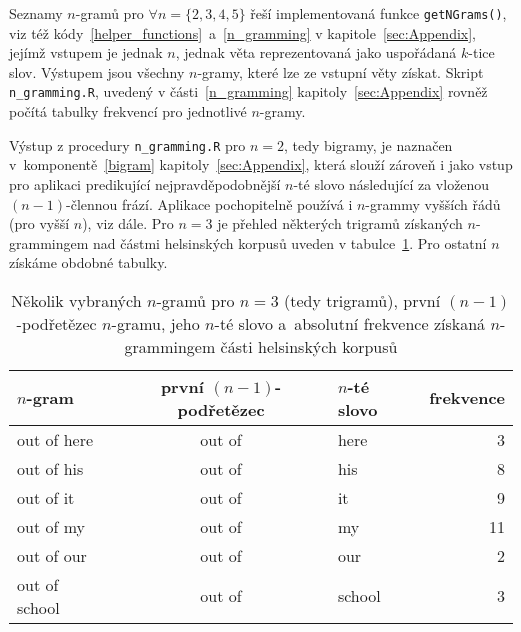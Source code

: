 Seznamy $n$-gramů pro $\forall n = \{2, 3, 4, 5\}$ řeší implementovaná
funkce \texttt{getNGrams()}, viz též kódy~\ref{helper_functions}~a~\ref{n_gramming}
v kapitole~\ref{sec:Appendix},
jejímž vstupem je jednak $n$, jednak věta reprezentovaná jako uspořádaná
$k$-tice slov. Výstupem jsou všechny $n$-gramy, které lze ze vstupní věty
získat. Skript \texttt{n\_gramming.R}, uvedený v části~\ref{n_gramming} kapitoly~\ref{sec:Appendix}
rovněž počítá tabulky
frekvencí pro jednotlivé $n$-gramy.

Výstup z procedury \texttt{n\_gramming.R} pro $n = 2$, tedy bigramy, je
naznačen v~komponentě~\ref{bigram} kapitoly~\ref{sec:Appendix}, která slouží zároveň i jako vstup pro
aplikaci predikující nejpravděpodobnější $n$-té slovo
následující za vloženou
$(n - 1)$-člennou frází.
Aplikace pochopitelně používá i $n$-grammy vyšších
řádů (pro vyšší $n$), viz dále. Pro $n = 3$ je přehled některých trigramů
získaných $n$-grammingem nad částmi helsinských korpusů uveden
v tabulce~\ref{trigramy}. Pro ostatní $n$ získáme obdobné tabulky.

\begin{table}[h]
\centering
\begin{tabular}{lclr}
    \hline
    $n$-gram & první $(n-1)$-podřetězec & $n$-té slovo & frekvence \\
    \hline
    out of here & out of & here & 3 \\
    out of his & out of & his & 8 \\
    out of it & out of & it & 9 \\
    out of my & out of & my & 11 \\
    out of our & out of & our & 2 \\
    out of school & out of & school & 3 \\
    \hline
\end{tabular}
\captionsetup{width = 0.77\textwidth}
\caption{Několik vybraných $n$-gramů pro $n = 3$ (tedy trigramů), %
         první $(n-1)$-podřetězec $n$-gramu, jeho $n$-té slovo %
         a~absolutní frekvence získaná $n$-grammingem %
         části helsinských korpusů\label{trigramy}}
\end{table}




\newpage







